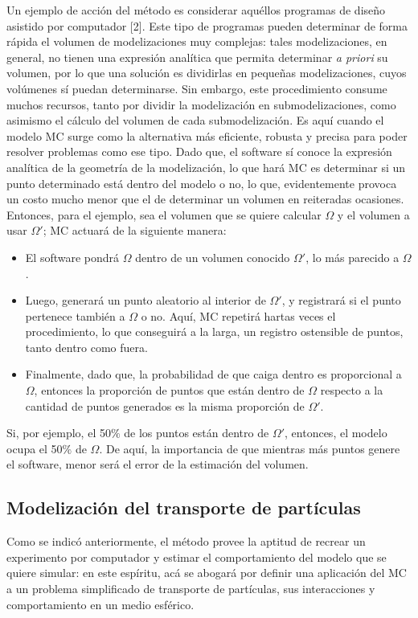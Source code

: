 Un ejemplo de acción del método es considerar aquéllos programas de diseño asistido por computador [2]. Este tipo de programas pueden determinar de forma rápida el volumen de modelizaciones muy complejas: tales modelizaciones, en general, no tienen una expresión analítica que permita determinar \emph{a priori} su volumen, por lo que una solución es dividirlas en pequeñas modelizaciones, cuyos volúmenes sí puedan determinarse. Sin embargo, este procedimiento consume muchos recursos, tanto por dividir la modelización en submodelizaciones, como asimismo el cálculo del volumen de cada submodelización. Es aquí cuando el modelo MC surge como la alternativa más eficiente, robusta y precisa para poder resolver problemas como ese tipo. Dado que, el software sí conoce la expresión analítica de la geometría de la modelización, lo que hará MC es determinar si un punto determinado está dentro del modelo o no, lo que, evidentemente provoca un costo mucho menor que el de determinar un volumen en reiteradas ocasiones. Entonces, para el ejemplo, sea el volumen que se quiere calcular $\Omega$ y el volumen a usar $\Omega'$; MC actuará de la siguiente manera:

\begin{itemize}
\item El software pondrá $\Omega$ dentro de un volumen conocido $\Omega'$, lo más parecido a $\Omega$.
\item Luego, generará un punto aleatorio al interior de $\Omega'$, y registrará si el punto pertenece también a $\Omega$ o no. Aquí, MC repetirá hartas veces el procedimiento, lo que conseguirá a la larga, un registro ostensible de puntos, tanto dentro como fuera.
\item Finalmente, dado que, la probabilidad de que caiga dentro es proporcional a $\Omega$, entonces la proporción de puntos que están dentro de $\Omega$ respecto a la cantidad de puntos generados es la misma proporción de $\Omega'$.
\end{itemize}

Si, por ejemplo, el 50$\%$ de los puntos están dentro de $\Omega'$, entonces, el modelo ocupa el 50$\%$ de $\Omega$. De aquí, la importancia de que mientras más puntos genere el software, menor será el error de la estimación del volumen.

\subsection{Modelización del transporte de partículas}
Como se indicó anteriormente, el método provee la aptitud de recrear un experimento por computador y estimar el comportamiento del modelo que se quiere simular: en este espíritu, acá se abogará por definir una aplicación del MC a un problema simplificado de transporte de partículas, sus interacciones y comportamiento en un medio esférico. \\

